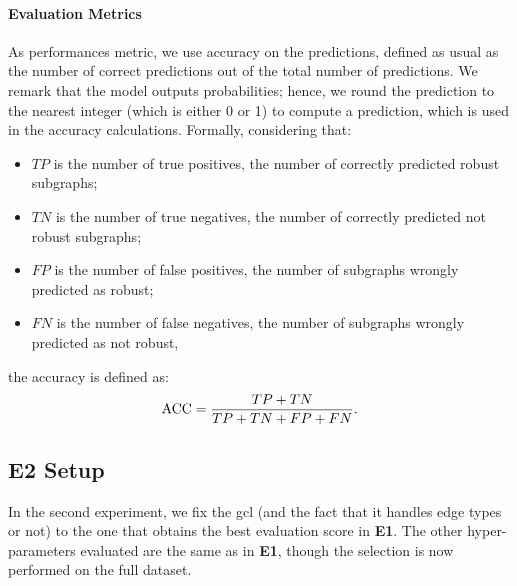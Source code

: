 \paragraph{Evaluation Metrics} As performances metric, we use accuracy on the predictions, defined as usual as the number of correct predictions out of the total number of predictions. We remark that the model outputs probabilities; hence, we round the prediction to the nearest integer (which is either 0 or 1) to compute a  prediction, which is used in the accuracy calculations. Formally, considering that: \begin{itemize}
    \item $TP$ is the number of true positives, \ie the number of correctly predicted robust subgraphs;
    \item $TN$ is the number of true negatives, \ie the number of correctly predicted not robust subgraphs;
    \item $FP$ is the number of false positives, \ie the number of subgraphs wrongly predicted as robust;
    \item $FN$ is the number of false negatives, \ie the number of subgraphs wrongly predicted as not robust,
\end{itemize}
the accuracy is defined as:
$$ \mathrm{ACC} = \frac{TP + TN}{TP + TN + FP + FN}.$$

\subsection{E2 Setup}
In the second experiment, we fix the \gls{gcl} (and the fact that it handles edge types or not) to the one that obtains the best evaluation score in \textbf{E1}.
The other hyper-parameters evaluated are the same as in \textbf{E1}, though the selection is now performed on the full dataset.

